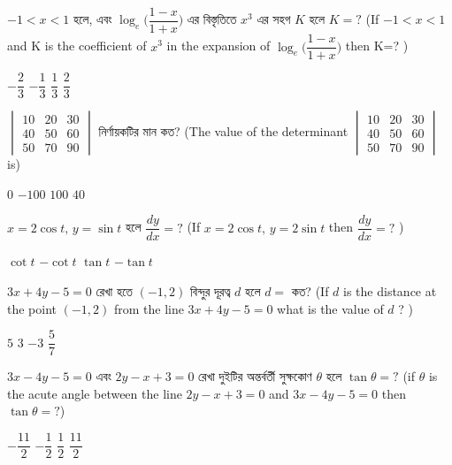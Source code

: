\documentclass[addpoints]{exam}
\begin{document}
\begin{questions}
\question   $ -1<x<1  $ হলে, এবং $ \log_{e}\Big(\dfrac{1-x}{1+x}\Big) $ এর বিস্তৃতিতে $ x^{3} $ এর সহগ $ K $ হলে $ K=? $ (If $ -1<x<1  $ and K is the coefficient of $ x^{3} $ in the expansion of $ \log_{e}\Big(\dfrac{1-x}{1+x}\Big) $ then K=? )

\begin{oneparchoices}
\choice $ -\dfrac{2}{3} $
\choice $ -\dfrac{1}{3} $
\choice $ \dfrac{1}{3} $
\choice $ \dfrac{2}{3} $
\end{oneparchoices}

\question $ \begin{vmatrix}
10 & 20 & 30\\
40 & 50 & 60\\
50 & 70 & 90 
\end{vmatrix}  $  নির্ণায়কটির মান কত? (The value of the determinant $ \begin{vmatrix}
10 & 20 & 30\\
40 & 50 & 60\\
50 & 70 & 90 
\end{vmatrix}  $ is)

\begin{oneparchoices}
\choice $ 0 $
\choice $ -100 $
\choice $ 100 $
\choice $ 40 $
\end{oneparchoices}

\question $ x=2\cos t,\, y= \sin t $  হলে  $ \dfrac{dy}{dx} = ? $ (If $ x=2\cos t,\, y= 2\sin t $ then $ \dfrac{dy}{dx} =? $ )

\begin{oneparchoices}
\choice $ \cot t $
\choice $ -\cot t $
\choice $ \tan t $
\choice $ -\tan t $
\end{oneparchoices}

\question $ 3x+4y-5=0 $ রেখা হতে $ (-1,2) $ বিন্দুর দূরত্ব $ d $ হলে $ d= $ কত? (If $ d $ is the distance at the point $ (-1,2) $ from the line $ 3x+4y-5=0 $ what is the value of $ d $ ? )

\begin{oneparchoices}
\choice $ 5 $
\choice $ 3 $ 
\choice $ -3 $
\choice $ \dfrac{5}{7} $
\end{oneparchoices}

\question $ 3x-4y-5=0 $ এবং $ 2y-x+3=0 $ রেখা দুইটির অন্তর্বর্তী সুক্ষকোণ $ \theta $ হলে $ \tan\theta =? $ (if $ \theta $ is the acute angle between the line $ 2y-x+3=0 $ and $ 3x-4y-5=0 $ then $ \tan\theta =? $)

\begin{oneparchoices}
\choice $ -\dfrac{11}{2} $
\choice $ -\dfrac{1}{2} $
\choice $ \dfrac{1}{2} $
\choice $ \dfrac{11}{2} $
\end{oneparchoices}



\end{questions}
\end{document}
